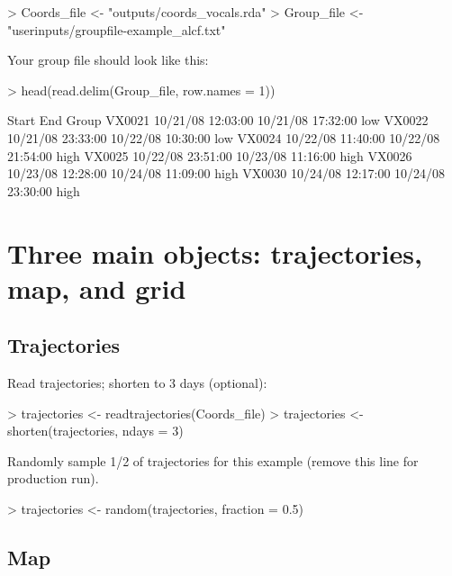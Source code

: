 \documentclass{article}
\renewenvironment{Schunk}{\vspace{\topsep}}{\vspace{\topsep}}
\begin{document}
\begin{Schunk}
\begin{Sinput}
> Coords_file <- "outputs/coords_vocals.rda"
> Group_file <- "userinputs/groupfile-example_alcf.txt"
\end{Sinput}
\end{Schunk}

Your group file should look like this:

\begin{Schunk}
\begin{Sinput}
> head(read.delim(Group_file, row.names = 1))
\end{Sinput}
\begin{Soutput}
                   Start               End Group
VX0021 10/21/08 12:03:00 10/21/08 17:32:00   low
VX0022 10/21/08 23:33:00 10/22/08 10:30:00   low
VX0024 10/22/08 11:40:00 10/22/08 21:54:00  high
VX0025 10/22/08 23:51:00 10/23/08 11:16:00  high
VX0026 10/23/08 12:28:00 10/24/08 11:09:00  high
VX0030 10/24/08 12:17:00 10/24/08 23:30:00  high
\end{Soutput}
\end{Schunk}

\section{Three main objects:  trajectories, map, and grid}

\subsection{Trajectories}

Read trajectories; shorten to 3 days (optional):

\begin{Schunk}
\begin{Sinput}
> trajectories <- readtrajectories(Coords_file)
> trajectories <- shorten(trajectories, ndays = 3)
\end{Sinput}
\end{Schunk}

Randomly sample 1/2 of trajectories for this example (remove this line
for production run).

\begin{Schunk}
\begin{Sinput}
> trajectories <- random(trajectories, fraction = 0.5)
\end{Sinput}
\end{Schunk}

\subsection{Map}
\end{document}
